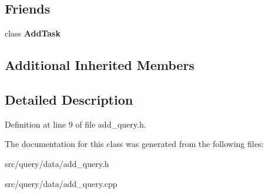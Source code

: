 \subsection*{Friends}
\begin{DoxyCompactItemize}
\item 
\mbox{\label{class_add_query_ae06ff1c286377c113fd46a2c075245e1}} 
class {\bfseries Add\+Task}
\end{DoxyCompactItemize}
\subsection*{Additional Inherited Members}


\subsection{Detailed Description}


Definition at line 9 of file add\+\_\+query.\+h.



The documentation for this class was generated from the following files\+:\begin{DoxyCompactItemize}
\item 
src/query/data/add\+\_\+query.\+h\item 
src/query/data/add\+\_\+query.\+cpp\end{DoxyCompactItemize}
